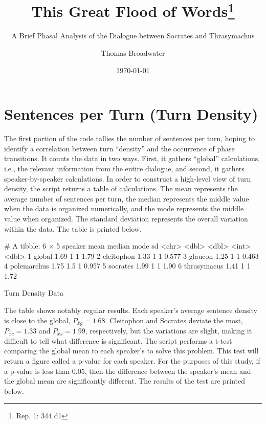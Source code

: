 \documentclass[noraggedright]{turabian-researchpaper}
\title{This Great Flood of Words\thanks{Rep. 1: 344 d1}}
\subtitle{A Brief Phasal Analysis of the Dialogue
  between Socrates and Thrasymachus}
\author{Thomas Broadwater}
\date{\today}
\begin{document}






\maketitle


%

\section{Sentences per Turn (Turn Density)}



The first portion of the code tallies the number of sentences per turn, hoping
to identify a correlation between turn ``density'' and the occurrence of phase
transitions. It counts the data in two ways. First, it gathers ``global''
calculations, i.e., the relevant information from the entire dialogue, and
second, it gathers speaker-by-speaker calculations. In order to construct a
high-level view of turn density, the script returns a table of calculations.
The mean represents the average number of sentences per turn, the median
represents the middle value when the data is organized numerically, and the mode
represents the middle value when organized. The standard deviation represents
the overall variation within the data. The table is printed below.

\begin{table}[htbp]
\begin{Schunk}
\begin{Soutput}
# A tibble: 6 × 5
  speaker      mean median  mode    sd
  <chr>       <dbl>  <dbl> <int> <dbl>
1 global       1.69    1       1 1.79 
2 cleitophon   1.33    1       1 0.577
3 glaucon      1.25    1       1 0.463
4 polemarchus  1.75    1.5     1 0.957
5 socrates     1.99    1       1 1.90 
6 thrasymacus  1.41    1       1 1.72 
\end{Soutput}
\end{Schunk}
\caption{Turn Density Data}
\label{tab:DensityData}
\end{table}

The table shows notably regular results. Each speaker's average sentence
density is close to the global, $P_{\bar{x}g} = 1.68$. Cleitophon and Socrates
deviate the most, $P_{\bar{x}c} = 1.33$ and $P_{\bar{x}s} = 1.99$, respectively, but
the variations are slight, making it difficult to tell what difference is
significant. The script performs a t-test comparing the global mean to each
speaker's to solve this problem. This test will return a figure called a
p-value for each speaker. For the purposes of this study, if a p-value is less
than 0.05, then the difference between the speaker's mean and the global mean
are significantly different. The results of the test are printed below.
\end{document}
